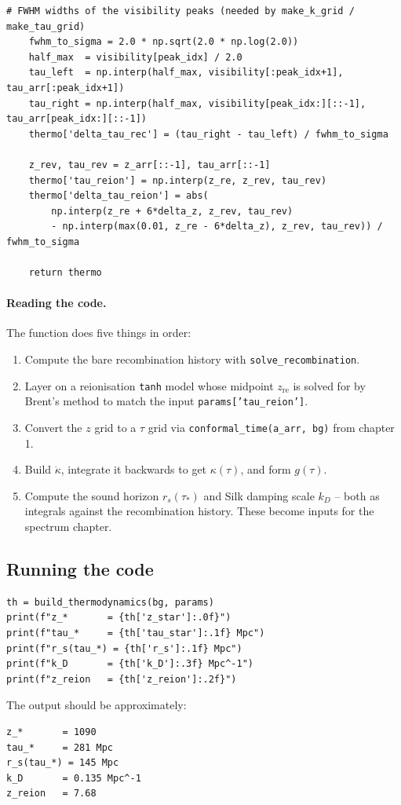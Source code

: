 \begin{codebox}
\begin{lstlisting}[style=python]
    # FWHM widths of the visibility peaks (needed by make_k_grid / make_tau_grid)
    fwhm_to_sigma = 2.0 * np.sqrt(2.0 * np.log(2.0))
    half_max  = visibility[peak_idx] / 2.0
    tau_left  = np.interp(half_max, visibility[:peak_idx+1], tau_arr[:peak_idx+1])
    tau_right = np.interp(half_max, visibility[peak_idx:][::-1], tau_arr[peak_idx:][::-1])
    thermo['delta_tau_rec'] = (tau_right - tau_left) / fwhm_to_sigma

    z_rev, tau_rev = z_arr[::-1], tau_arr[::-1]
    thermo['tau_reion'] = np.interp(z_re, z_rev, tau_rev)
    thermo['delta_tau_reion'] = abs(
        np.interp(z_re + 6*delta_z, z_rev, tau_rev)
        - np.interp(max(0.01, z_re - 6*delta_z), z_rev, tau_rev)) / fwhm_to_sigma

    return thermo
\end{lstlisting}
\end{codebox}

\paragraph{Reading the code.}
The function does five things in order:
\begin{enumerate}
  \item Compute the bare recombination history with \texttt{solve\_recombination}.
  \item Layer on a reionisation \texttt{tanh} model whose midpoint $z_\mathrm{re}$ is solved for by Brent's method to match the input \texttt{params['tau\_reion']}.
  \item Convert the $z$ grid to a $\tau$ grid via \texttt{conformal\_time(a\_arr, bg)} from chapter 1.
  \item Build $\dot\kappa$, integrate it backwards to get $\kappa(\tau)$, and form $g(\tau)$.
  \item Compute the sound horizon $r_s(\tau_*)$ and Silk damping scale $k_D$ -- both as integrals against the recombination history. These become inputs for the spectrum chapter.
\end{enumerate}

\subsection{Running the code}

\begin{codebox}
\begin{lstlisting}[style=python]
th = build_thermodynamics(bg, params)
print(f"z_*       = {th['z_star']:.0f}")
print(f"tau_*     = {th['tau_star']:.1f} Mpc")
print(f"r_s(tau_*) = {th['r_s']:.1f} Mpc")
print(f"k_D       = {th['k_D']:.3f} Mpc^-1")
print(f"z_reion   = {th['z_reion']:.2f}")
\end{lstlisting}
\end{codebox}
The output should be approximately:
\begin{verbatim}
z_*       = 1090
tau_*     = 281 Mpc
r_s(tau_*) = 145 Mpc
k_D       = 0.135 Mpc^-1
z_reion   = 7.68
\end{verbatim}


